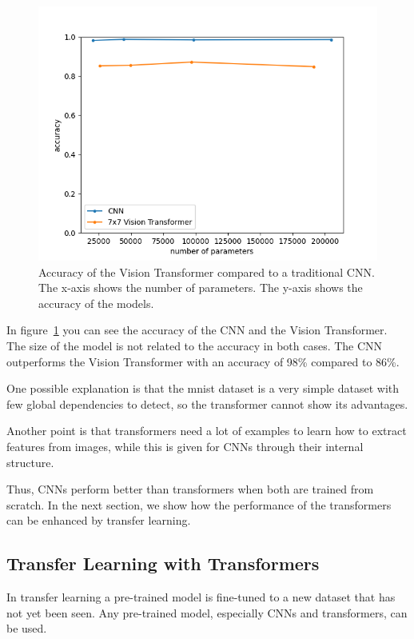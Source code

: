 \documentclass[a4paper]{scrartcl}
\begin{document}
    \begin{figure}[btp]
        \centering
        \includegraphics[width=0.8\linewidth]{img/plots/cnn-patch-comparison}
        \caption[Vision transformers compared to CNNs]{Accuracy of the Vision Transformer compared to a traditional CNN.
        The x-axis shows the number of parameters.
        The y-axis shows the accuracy of the models.
        }
        \label{fig:cnn-patch-comparison}
    \end{figure}

    In figure~\ref{fig:cnn-patch-comparison} you can see the accuracy of the CNN and the Vision Transformer.
    The size of the model is not related to the accuracy in both cases.
    The CNN outperforms the Vision Transformer with an accuracy of 98\% compared to 86\%.

    One possible explanation is that the mnist dataset is a very simple dataset with few global dependencies to detect, so the transformer cannot show its advantages.

    Another point is that transformers need a lot of examples to learn how to extract features from images, while this is given for CNNs through their internal structure.

    Thus, CNNs perform better than transformers when both are trained from scratch.
    In the next section, we show how the performance of the transformers can be enhanced by transfer learning.

    \subsection{Transfer Learning with Transformers}\label{subsec:transfer-learning-with-transformers}
    In transfer learning a pre-trained model is fine-tuned to a new dataset that has not yet been seen.
    Any pre-trained model, especially CNNs and transformers, can be used.
\end{document}
